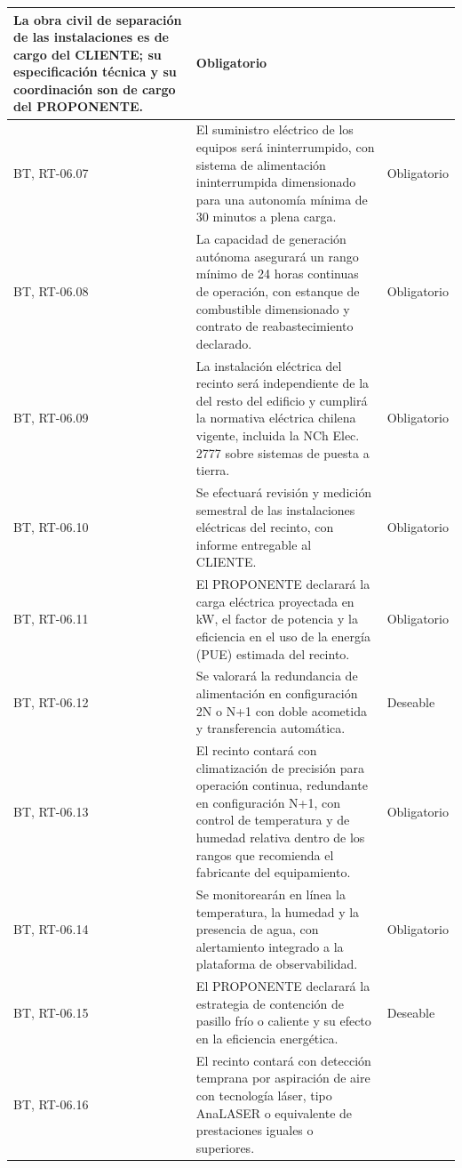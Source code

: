\begin{longtable}{|L{0.098425\AnchoTablaAnexo}|L{0.814961\AnchoTablaAnexo}|L{0.086614\AnchoTablaAnexo}|}
La obra civil de separación de las instalaciones es de cargo del CLIENTE; su especificación técnica y su coordinación son de cargo del PROPONENTE. &
Obligatorio \\ \hline
{}
BT, RT-06.07 &
El suministro eléctrico de los equipos será ininterrumpido, con sistema de alimentación ininterrumpida dimensionado para una autonomía mínima de 30 minutos a plena carga. &
Obligatorio \\ \hline
BT, RT-06.08 &
La capacidad de generación autónoma asegurará un rango mínimo de 24 horas continuas de operación, con estanque de combustible dimensionado y contrato de reabastecimiento declarado. &
Obligatorio \\ \hline
{}
BT, RT-06.09 &
La instalación eléctrica del recinto será independiente de la del resto del edificio y cumplirá la normativa eléctrica chilena vigente, incluida la NCh Elec. 2777 sobre sistemas de puesta a tierra. &
Obligatorio \\ \hline
BT, RT-06.10 &
Se efectuará revisión y medición semestral de las instalaciones eléctricas del recinto, con informe entregable al CLIENTE. &
Obligatorio \\ \hline
{}
BT, RT-06.11 &
El PROPONENTE declarará la carga eléctrica proyectada en kW, el factor de potencia y la eficiencia en el uso de la energía (PUE) estimada del recinto. &
Obligatorio \\ \hline
BT, RT-06.12 &
Se valorará la redundancia de alimentación en configuración 2N o N+1 con doble acometida y transferencia automática. &
Deseable \\ \hline
{}
BT, RT-06.13 &
El recinto contará con climatización de precisión para operación continua, redundante en configuración N+1, con control de temperatura y de humedad relativa dentro de los rangos que recomienda el fabricante del equipamiento. &
Obligatorio \\ \hline
BT, RT-06.14 &
Se monitorearán en línea la temperatura, la humedad y la presencia de agua, con alertamiento integrado a la plataforma de observabilidad. &
Obligatorio \\ \hline
{}
BT, RT-06.15 &
El PROPONENTE declarará la estrategia de contención de pasillo frío o caliente y su efecto en la eficiencia energética. &
Deseable \\ \hline
BT, RT-06.16 &
El recinto contará con detección temprana por aspiración de aire con tecnología láser, tipo AnaLASER o equivalente de prestaciones iguales o superiores. &

\end{longtable}
